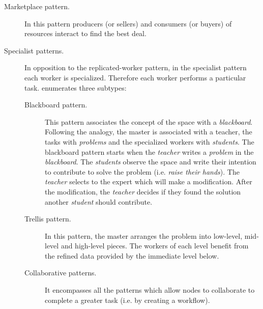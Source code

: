 \begin{description}
  \item[Marketplace pattern.] In this pattern producers (or sellers) and consumers (or buyers) of resources interact to find the best deal. %
  \item[Specialist patterns.] In opposition to the replicated-worker pattern, in the specialist pattern each worker is specialized.
                              Therefore each worker performs a particular task.
                              \citeauthor{freeman_javaspaces_1999} enumerates three subtypes:
			      \begin{description}
				  \item[Blackboard pattern.]
					This pattern associates the concept of the space with a \emph{blackboard}.
					Following the analogy, the master is associated with a teacher, the tasks with \emph{problems} and the specialized workers with \emph{students}.
					The blackboard pattern starts when the \emph{teacher} writes a \emph{problem} in the \emph{blackboard}.
					The \emph{students} observe the space and write their intention to contribute to solve the problem (i.e. \emph{raise their hands}).
					The \emph{teacher} selects to the expert which will make a modification.
					After the modification, the \emph{teacher} decides if they found the solution another \emph{student} should contribute.
				  \item [Trellis pattern.]
					In this pattern, the master arranges the problem into low-level, mid-level and high-level pieces.
					The workers of each level benefit from the refined data provided by the immediate level below.
				  \item [Collaborative patterns.]
					It encompasses all the patterns which allow nodes to collaborate to complete a greater task (i.e. by creating a workflow).
			      \end{description}
\end{description}


